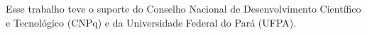

\begin{agradecimentos}

Esse trabalho teve o suporte do Conselho Nacional de Desenvolvimento Científico e Tecnológico (CNPq) e da Universidade Federal do Pará (UFPA).

\end{agradecimentos}